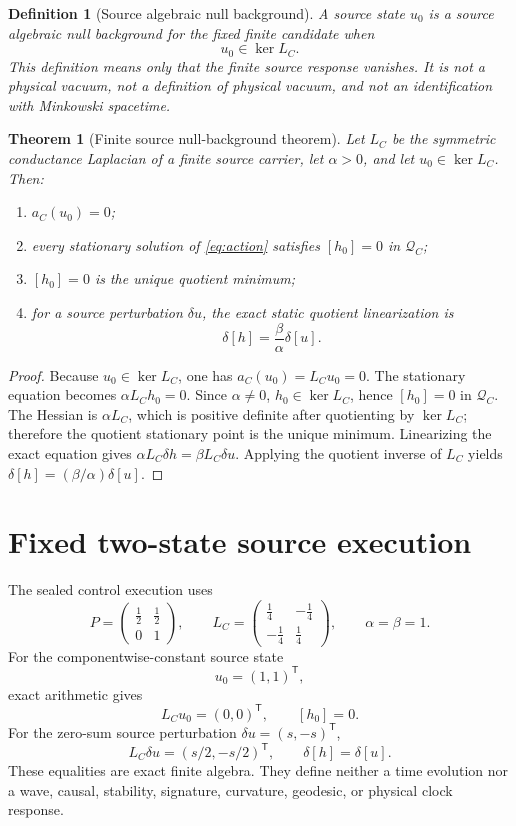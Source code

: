 \documentclass[11pt]{article}
\newtheorem{definition}{Definition}
\newtheorem{theorem}{Theorem}
\newcommand{\Qspace}{\mathcal Q_C}
\begin{document}
\begin{definition}[Source algebraic null background]
A source state \(u_0\) is a \emph{source algebraic null background} for the
fixed finite candidate when
\[
  u_0\in\ker L_C.
\]
This definition means only that the finite source response vanishes.  It is
not a physical vacuum, not a definition of physical vacuum, and not an identification with
Minkowski spacetime.
\end{definition}

\begin{theorem}[Finite source null-background theorem]
\label{thm:null}
Let \(L_C\) be the symmetric conductance Laplacian of a finite source carrier,
let \(\alpha>0\), and let \(u_0\in\ker L_C\).  Then:
\begin{enumerate}
\item \(a_C(u_0)=0\);
\item every stationary solution of \eqref{eq:action} satisfies
      \([h_0]=0\) in \(\Qspace\);
\item \([h_0]=0\) is the unique quotient minimum;
\item for a source perturbation \(\delta u\), the exact static quotient
      linearization is
      \[
        \delta[h]=\frac{\beta}{\alpha}\delta[u].
      \]
\end{enumerate}
\end{theorem}

\begin{proof}
Because \(u_0\in\ker L_C\), one has \(a_C(u_0)=L_Cu_0=0\).  The stationary
equation becomes \(\alpha L_Ch_0=0\).  Since \(\alpha\ne0\),
\(h_0\in\ker L_C\), hence \([h_0]=0\) in \(\Qspace\).
The Hessian is \(\alpha L_C\), which is positive definite after quotienting
by \(\ker L_C\); therefore the quotient stationary point is the unique
minimum.  Linearizing the exact equation gives
\(\alpha L_C\delta h=\beta L_C\delta u\).  Applying the quotient inverse of
\(L_C\) yields
\(\delta[h]=(\beta/\alpha)\delta[u]\).
\end{proof}

\section{Fixed two-state source execution}

The sealed control execution uses
\[
  P=\begin{pmatrix}\frac12&\frac12\\0&1\end{pmatrix},
  \qquad
  L_C=\begin{pmatrix}\frac14&-\frac14\\-\frac14&\frac14\end{pmatrix},
  \qquad
  \alpha=\beta=1.
\]
For the componentwise-constant source state
\[
  u_0=(1,1)^{\mathsf T},
\]
exact arithmetic gives
\[
  L_Cu_0=(0,0)^{\mathsf T},\qquad [h_0]=0.
\]
For the zero-sum source perturbation
\(\delta u=(s,-s)^{\mathsf T}\),
\[
  L_C\delta u=(s/2,-s/2)^{\mathsf T},
  \qquad
  \delta[h]=\delta[u].
\]
These equalities are exact finite algebra.  They define neither a time
evolution nor a wave, causal, stability, signature, curvature, geodesic, or
physical clock response.
\end{document}
